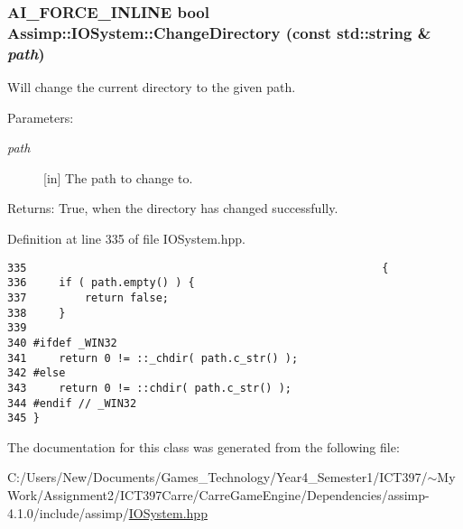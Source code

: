 \hypertarget{class_assimp_1_1_i_o_system_93e80760bd5d5239ba8eab3bd31efa6b}{
\subsubsection[ChangeDirectory]{\setlength{\rightskip}{0pt plus 5cm}AI\_\-FORCE\_\-INLINE bool Assimp::IOSystem::ChangeDirectory (const std::string \& {\em path})}}
\label{class_assimp_1_1_i_o_system_93e80760bd5d5239ba8eab3bd31efa6b}


Will change the current directory to the given path. 

\begin{Desc}
\item[Parameters:]
\begin{description}
\item[{\em path}]\mbox{[}in\mbox{]} The path to change to. \end{description}
\end{Desc}
\begin{Desc}
\item[Returns:]True, when the directory has changed successfully. \end{Desc}


Definition at line 335 of file IOSystem.hpp.

\begin{Code}\begin{verbatim}335                                                       {
336     if ( path.empty() ) {
337         return false;
338     }
339 
340 #ifdef _WIN32
341     return 0 != ::_chdir( path.c_str() );
342 #else
343     return 0 != ::chdir( path.c_str() );
344 #endif // _WIN32
345 }
\end{verbatim}
\end{Code}




The documentation for this class was generated from the following file:\begin{CompactItemize}
\item 
C:/Users/New/Documents/Games\_\-Technology/Year4\_\-Semester1/ICT397/$\sim$My Work/Assignment2/ICT397Carre/CarreGameEngine/Dependencies/assimp-4.1.0/include/assimp/\hyperlink{_i_o_system_8hpp}{IOSystem.hpp}\end{CompactItemize}
